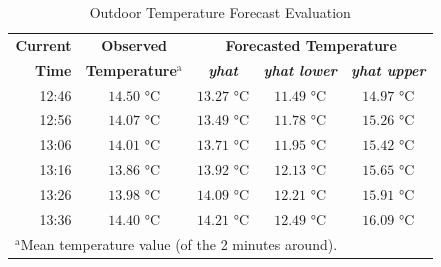 \documentclass[conference]{IEEEtran}
\begin{document}
\begin{table}[htbp]
\caption{Outdoor Temperature Forecast Evaluation}
\begin{center}
\begin{tabular}{|r|c|c|c|c|}
\hline
\textbf{Current} & \textbf{Observed} & \multicolumn{3}{|c|}{\textbf{Forecasted Temperature}} \\
\cline{3-5}
\textbf{Time} & \textbf{Temperature}$^{\mathrm{a}}$ & \textbf{\textit{yhat}} & \textbf{\textit{yhat lower}} & \textbf{\textit{yhat upper}} \\
\hline
12:46 & $14.50$ °C & $13.27$ °C & $11.49$ °C & $14.97$ °C \\
\hline
12:56 & $14.07$ °C & $13.49$ °C & $11.78$ °C & $15.26$ °C \\
\hline
13:06 & $14.01$ °C & $13.71$ °C & $11.95$ °C & $15.42$ °C \\
\hline
13:16 & $13.86$ °C & $13.92$ °C & $12.13$ °C & $15.65$ °C \\
\hline
13:26 & $13.98$ °C & $14.09$ °C & $12.21$ °C & $15.91$ °C \\
\hline
13:36 & $14.40$ °C & $14.21$ °C & $12.49$ °C & $16.09$ °C \\
\hline
\multicolumn{4}{l}{$^{\mathrm{a}}$Mean temperature value (of the 2 minutes around).}
\end{tabular}
\label{tab_forecast_outdoor}
\end{center}
\end{table}
\end{document}
